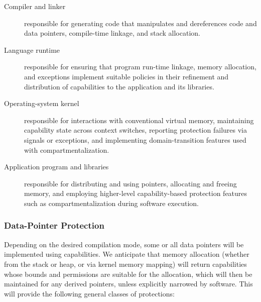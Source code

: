 \begin{description}

\item[Compiler and linker] responsible for generating code that manipulates
  and dereferences code and data pointers, compile-time linkage, and
  stack allocation.

\item[Language runtime] responsible for ensuring that program run-time
  linkage, memory allocation, and exceptions implement suitable policies in
  their refinement and distribution of capabilities to the application and its
  libraries.

\item[Operating-system kernel] responsible for interactions with conventional
  virtual memory, maintaining capability state across context switches,
  reporting protection failures via signals or exceptions, and implementing
  domain-transition features used with compartmentalization.

\item[Application program and libraries] responsible for distributing and
  using pointers, allocating and freeing memory, and employing higher-level
  capability-based protection features such as compartmentalization during
  software execution.

\end{description}

\subsubsection{Data-Pointer Protection}

Depending on
the desired
compilation mode, some or all data pointers will be implemented
using capabilities.
We anticipate that memory allocation (whether from the stack or heap, or via
kernel memory mapping) will return capabilities whose bounds and permissions
are suitable for the allocation, which will then be maintained for any derived
pointers, unless explicitly narrowed by software.
This will provide the following general classes of protections:

